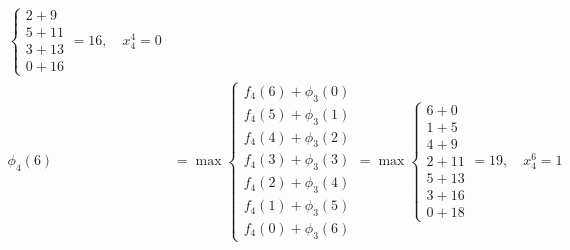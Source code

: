 \documentclass{article}
\begin{document}
\[\begin{aligned}
\begin{cases}
                                                  2 + 9  \\
                                                  5 + 11 \\
                                                  3 + 13 \\
                                                  0 + 16
                                              \end{cases} = 16, \quad x_4^4 = 0               \\
        \phi_4(6) & = \max \begin{cases}
                               f_4(6) + \phi_3(0) \\
                               f_4(5) + \phi_3(1) \\
                               f_4(4) + \phi_3(2) \\
                               f_4(3) + \phi_3(3) \\
                               f_4(2) + \phi_3(4) \\
                               f_4(1) + \phi_3(5) \\
                               f_4(0) + \phi_3(6)
                           \end{cases} = \max \begin{cases}
                                                  6 + 0  \\
                                                  1 + 5  \\
                                                  4 + 9  \\
                                                  2 + 11 \\
                                                  5 + 13 \\
                                                  3 + 16 \\
                                                  0 + 18
                                              \end{cases} = 19, \quad x_4^6 = 1               \\
    \end{aligned}
\]
\end{document}
